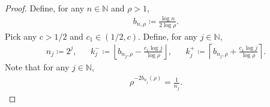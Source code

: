 \documentclass[12pt,reqno]{amsart}
\theoremstyle{definition}
\theoremstyle{plain}
\begin{document}
\begin{proof}
Define, for any $n\in\mathbb{N}$ and $\rho>1$, 
\begin{align*}
    b_{n,\rho}\coloneqq \frac{\log n}{2\log\rho}.
\end{align*}
Pick any $c>1/2$ and $c_1\in(1/2,c)$. Define, for any $j\in\mathbb{N}$,
\begin{align*}
    n_j \coloneqq 2^j,
    &&
    k^-_j \coloneqq \left \lfloor b_{n_j,\rho}-\frac{c_1\log{j}}{\log{\rho}}\right\rfloor,
    &&
    k^+_j \coloneqq \left \lceil b_{n_j,\rho}+\frac{c_1\log{j}}{\log{\rho}}\right\rceil.
\end{align*}
Note that for any $j\in\mathbb{N}$, 
\begin{align}\label{eq:rho-bn}
    \rho^{-2b_{n_j}(\rho)}
    =\frac{1}{n_j}.
\end{align}


\end{proof}
\end{document}
